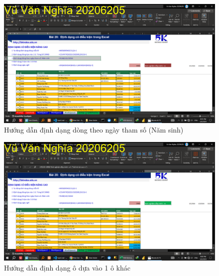 \documentclass{article}
\begin{document}
\begin{figure}[H]
\centering
\includegraphics[scale = 0.15]{Video8/HuongDan/2.png}
\caption{Hướng dẫn định dạng dòng theo ngày tham số (Năm sinh)}
\end{figure}

\begin{figure}[H]
\centering
\includegraphics[scale = 0.15]{Video8/HuongDan/3.png}
\caption{Hướng dẫn định dạng ô dựa vào 1 ô khác}
\end{figure}
\end{document}
